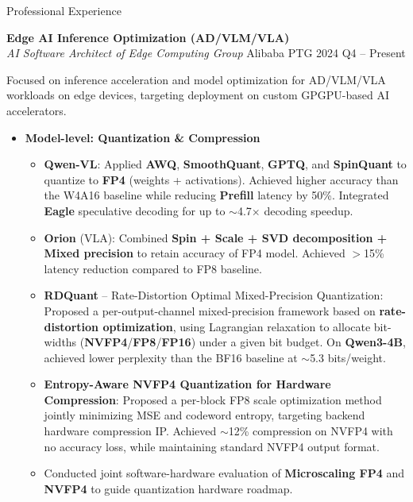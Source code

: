 \documentclass{resume} %
\begin{document}
\begin{rSection}{Professional Experience}

\noindent



\textbf{Edge AI Inference Optimization (AD/VLM/VLA)} \\ %
\textit{AI Software Architect of Edge Computing Group} \hfill Alibaba PTG \hfill 2024 Q4 -- Present

\vspace{4pt}

Focused on inference acceleration and model optimization for AD/VLM/VLA workloads on edge devices, targeting deployment on custom GPGPU-based AI accelerators.

\begin{itemize}

\item \textbf{Model-level: Quantization \& Compression}
\begin{itemize}
  \item \textbf{Qwen-VL}: Applied \textbf{AWQ}, \textbf{SmoothQuant}, \textbf{GPTQ}, and \textbf{SpinQuant} to quantize to \textbf{FP4} (weights + activations). Achieved higher accuracy than the W4A16 baseline while reducing \textbf{Prefill} latency by 50\%. Integrated \textbf{Eagle} speculative decoding for up to $\sim$4.7$\times$ decoding speedup.
  \item \textbf{Orion} (VLA): Combined \textbf{Spin + Scale + SVD decomposition + Mixed precision} to retain accuracy of FP4 model. Achieved $>$15\% latency reduction compared to FP8 baseline.
  \item \textbf{RDQuant} -- Rate-Distortion Optimal Mixed-Precision Quantization:
  Proposed a per-output-channel mixed-precision framework based on \textbf{rate-distortion optimization}, using Lagrangian relaxation to allocate bit-widths (\textbf{NVFP4}/\textbf{FP8}/\textbf{FP16}) under a given bit budget. On \textbf{Qwen3-4B}, achieved lower perplexity than the BF16 baseline at $\sim$5.3 bits/weight.
  \item \textbf{Entropy-Aware NVFP4 Quantization for Hardware Compression}:
  Proposed a per-block FP8 scale optimization method jointly minimizing MSE and codeword entropy, targeting backend hardware compression IP. Achieved $\sim$12\% compression on NVFP4 with no accuracy loss, while maintaining standard NVFP4 output format.
  \item Conducted joint software-hardware evaluation of \textbf{Microscaling FP4} and \textbf{NVFP4} to guide quantization hardware roadmap.
\end{itemize}


\end{itemize}
\end{rSection}
\end{document}
